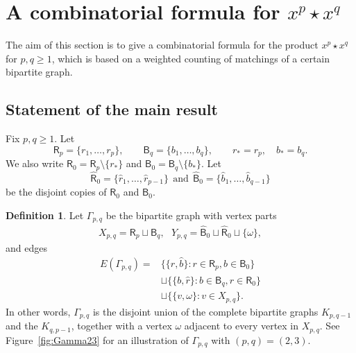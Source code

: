 \documentclass[12pt,a4paper,reqno]{amsart}
\numberwithin{equation}{section}
\theoremstyle{definition}
\newtheorem{definition}[theorem]{Definition}
\theoremstyle{remark}
\begin{document}
\section{A combinatorial formula for \texorpdfstring{$x^p\star x^q$}{monomial star products}}\label{sec:matching}

The aim of this section is to give a   combinatorial formula for the product  $x^p\star x^q$ for $p,q\geq 1$, which is based on a weighted  counting of matchings of a certain bipartite graph. 

\subsection{Statement of the main result}

Fix $p,q\geq1$.  Let
\[
 \mathsf R_p=\{r_1,\ldots,r_p\},\qquad
 \mathsf B_q=\{b_1,\ldots,b_q\},
 \qquad r_\ast=r_p,\quad b_\ast=b_q.
\]
We also write  $\mathsf R_0=\mathsf R_p\setminus\{r_\ast\}$ and
$\mathsf B_0=\mathsf B_q\setminus\{b_\ast\}$.  Let
\[
\widehat{\mathsf R}_0=\{\widehat{r}_1,\ldots, \widehat{r}_{p-1}\}\ \ \text{and}\ \ \widehat{\mathsf B}_0=\{\widehat{b}_1,\ldots, \widehat{b}_{q-1}\}
\]
be the disjoint copies of $\mathsf R_0$ and $\mathsf B_0$.

\begin{definition}\label{def:Gamma}
Let $\Gamma_{p,q}$ be the bipartite graph with vertex parts
\[
 \begin{aligned}
 X_{p,q}=\mathsf R_p\sqcup\mathsf B_q,\ \ \ 
 Y_{p,q}=\widehat{\mathsf B}_0\sqcup
          \widehat{\mathsf R}_0\sqcup\{\omega\},
 \end{aligned}
\]
and edges
\begin{align*}
 E(\Gamma_{p,q})={}&
 \bigl\{\{r,\widehat b\}:r\in\mathsf R_p,
                   b\in\mathsf B_0\bigr\}\\
 &\sqcup
 \bigl\{\{b,\widehat r\}:b\in\mathsf B_q,
                   r\in\mathsf R_0\bigr\}\\
 &\sqcup
 \bigl\{\{v,\omega\}:v\in X_{p,q}\bigr\}.
\end{align*}
In other words, $\Gamma_{p,q}$ is the disjoint union of the complete bipartite graphs $K_{p,q-1}$ and 
the $K_{q,p-1}$, together with a vertex $\omega$   adjacent to every vertex in 
$X_{p,q}$.  See Figure~\ref{fig:Gamma23} for an illustration of $\Gamma_{p,q}$ with $(p,q)=(2,3)$.
\end{definition}
\end{document}
